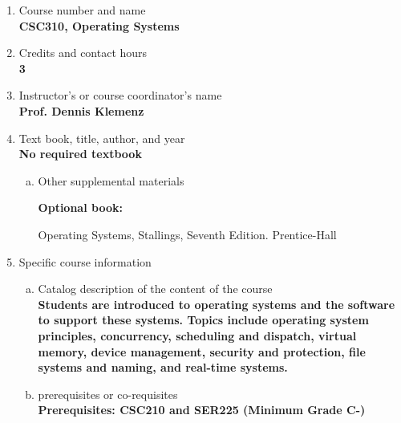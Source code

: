 \label{CSC310}  %
\begin{enumerate}[1.]
\item Course number and name\\
  {\bfseries
    CSC310, Operating Systems
  }

\item Credits and contact hours\\
  {\bfseries
    3
  }

\item Instructor's or course coordinator's name\\
  {\bfseries
    Prof. Dennis Klemenz
  }

\item Text book, title, author, and year\\
  {\bfseries
    No required textbook
  }
\begin{enumerate}[a.]
\item Other supplemental materials\\
  {\bfseries
    Optional book:

    Operating Systems, Stallings, Seventh Edition. Prentice-Hall
  }
\end{enumerate}

\item Specific course information
\begin{enumerate}[a.]
\item Catalog description of the content of the course\\
  {\bfseries
Students are introduced to operating systems and the software to support these systems. Topics include operating system principles, concurrency, scheduling and dispatch, virtual memory, device management, security and protection, file systems and naming, and real-time systems.
  }

\item prerequisites or co-requisites\\
  {\bfseries
    Prerequisites: CSC210 and SER225 (Minimum Grade C-)
  }


\end{enumerate}
\end{enumerate}
